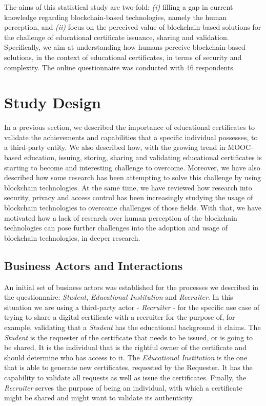 The aims of this statistical study are two-fold: \emph{(i)} filling a gap in current knowledge regarding blockchain-based technologies, namely the human perception, and \emph{(ii)} focus on the perceived value of blockchain-based solutions for the challenge of educational certificate issuance, sharing and validation. Specifically, we aim at understanding how humans perceive blockchain-based solutions, in the context of educational certificates, in terms of security and complexity. The online questionnaire was conducted with 46 respondents.

\section{Study Design}

In a previous section, we described the importance of educational certificates to validate the achievements and capabilities that a specific individual possesses, to a third-party entity. We also described how, with the growing trend in MOOC-based education, issuing, storing, sharing and validating educational certificates is starting to become and interesting challenge to overcome. Moreover, we have also described how some research has been attempting to solve this challenge by using blockchain technologies. At the same time, we have reviewed how research into security, privacy and access control has been increasingly studying the usage of blockchain technologies to overcome challenges of those fields. With that, we have motivated how a lack of research over human perception of the blockchain technologies can pose further challenges into the adoption and usage of blockchain technologies, in deeper research.

\subsection{Business Actors and Interactions}

An initial set of business actors was established for the processes we described in the questionnaire: \textit{Student}, \textit{Educational Institution} and \textit{Recruiter}. In this situation we are using a third-party actor - \textit{Recruiter} - for the specific use case of trying to share a digital certificate with a recruiter for the purpose of, for example, validating that a \textit{Student} has the educational background it claims. The \textit{Student} is the requester of the certificate that needs to be issued, or is going to be shared. It is the individual that is the rightful owner of the certificate and should determine who has access to it. The \textit{Educational Institution} is the one that is able to generate new certificates, requested by the Requester. It has the capability to validate all requests as well as issue the certificates. Finally, the \textit{Recruiter} serves the purpose of being an individual, with which a certificate might be shared and might want to validate its authenticity.

